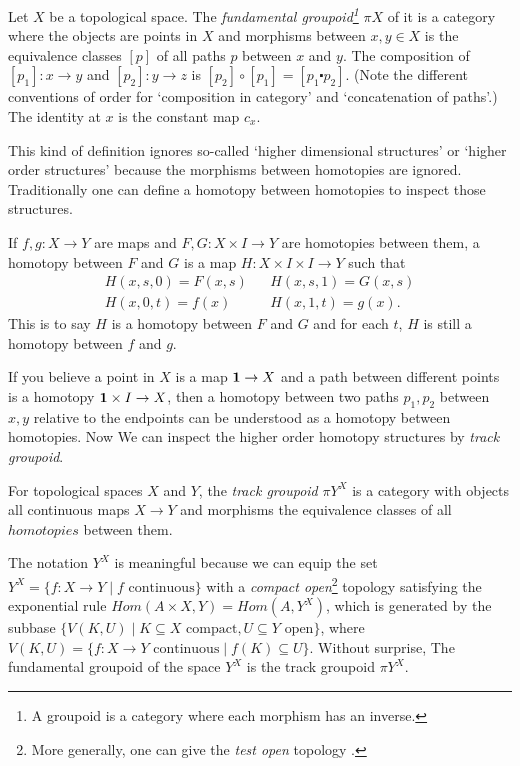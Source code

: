 \begin{definition}
    \label{fundamental-groupoid}
    Let $X$ be a topological space. The {\it fundamental groupoid\footnote{
        A groupoid is a category where each morphism has an inverse.
    }} $\pi X$ of it is
    a category where the objects are points in $X$ and morphisms
    between $x,y\in X$ is the equivalence classes $[p]$ of all paths
    $p$ between $x$ and $y$.
    The composition of $[p_1]: x\to y$ and $[p_2]:y\to z$ is
    $[p_2]\circ[p_1]=[p_1\centerdot p_2]$. (Note the different conventions
    of order for `composition in category' and `concatenation of paths'.)
    The identity at $x$ is the constant map $c_x$.
\end{definition}

This kind of definition ignores so-called `higher dimensional structures' 
or `higher order structures' because the morphisms between homotopies are
ignored. Traditionally one can define a homotopy between homotopies to
inspect those structures.

\begin{definition}
    If $f,g:X\to Y$ are maps and $F,G: X\times I\to Y$ are homotopies 
    between them, a homotopy between $F$ and $G$ is a map 
    $H: X\times I\times I\to Y$ such that
    $$
    \begin{array}{lcl}
        H(x,s,0) = F(x, s) & & H(x, s, 1) = G(x, s) \\
        H(x, 0, t) = f(x) & & H(x,1,t) = g(x).
    \end{array}
    $$
    This is to say $H$ is a homotopy between $F$ and $G$ and for each
    $t$, $H$ is still a homotopy between $f$ and $g$.
\end{definition}

If you believe a point in $X$ is a map $\mathbf{1}\to X$ and a path between
different points is a homotopy $\mathbf{1}\times I\to X$, then a homotopy
between two paths $p_1,p_2$ between $x,y$ relative to the endpoints
can be understood as a homotopy between homotopies.  
Now We can inspect the higher order homotopy structures by {\it track
groupoid}.

\begin{definition}
    For topological spaces $X$ and $Y$, the {\it track groupoid} $\pi Y^X$
    is a category with objects all continuous maps $X\to Y$ and morphisms
    the equivalence classes of all $homotopies$ between them. 
\end{definition}

The notation $Y^X$ is meaningful because we can equip the set $Y^X=\{
f: X\to Y\mid f\text{ continuous}\}$ with a {\it compact open}\footnote{
More generally, one can give the {\it test open} topology 
\cite{topology-and-groupoids}.} topology satisfying the exponential rule
$Hom(A\times X, Y)=Hom(A, Y^X)$, which is generated by the subbase
$\{V(K, U)\mid K\subseteq X\text{ compact},U\subseteq Y\text{ open}\}$,
where $V(K, U) = \{f: X\to Y\text{ continuous}\mid f(K)\subseteq U\}$.
Without surprise, The fundamental groupoid of the space $Y^X$ is the
track groupoid $\pi Y^X$. 

